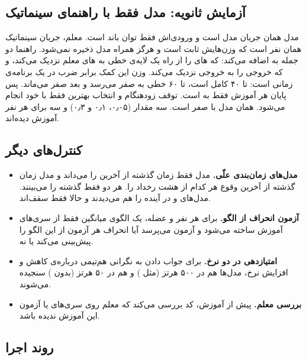 \subsection{آزمایش ثانویه: مدل فقط‌ با راهنمای سینماتیک}

مدل  همان جریان  مدل  است و ورودی‌اش فقط توان باند  است. معلم، جریان سینماتیک  همان نفر است که وزن‌هایش ثابت است و هرگز همراه مدل ذخیره نمی‌شود. راهنما دو جمله به  اضافه می‌کند:  که های  را از راه یک لایه‌ی خطی به های معلم نزدیک می‌کند، و  که خروجی را به خروجی  نزدیک می‌کند. وزن این کمک برابر  ضرب در یک برنامه‌ی زمانی است: تا  ۴۰ کامل است، تا  ۶۰ خطی به صفر می‌رسد و بعد صفر می‌ماند. پس پایان هر آموزش فقط  به  است. توقف زودهنگام و انتخاب بهترین  فقط با   خود  انجام می‌شود.  همان مدل با  صفر است. سه مقدار  (۰٫۰۵، ۰٫۱ و ۰٫۳) و سه  برای هر نفر آموزش دیده‌اند.

\subsection{کنترل‌های دیگر}

\begin{itemize}
\item \textbf{مدل‌های زمان‌بندی علّی.} مدل  فقط زمان گذشته از آخرین  را می‌داند و مدل  زمان گذشته از آخرین وقوع هر کدام از هشت رخداد را. هر دو فقط گذشته را می‌بینند. مدل‌های  و  در  آینده را هم می‌دیدند و حالا فقط سقف‌اند.
\item \textbf{آزمون انحراف از الگو.} برای هر نفر و عضله، یک الگوی میانگین  فقط از سری‌های آموزش ساخته می‌شود و آزمون می‌پرسد آیا  انحراف هر  آزمون از این الگو را پیش‌بینی می‌کند یا نه.
\item \textbf{امتیازدهی در دو نرخ.} برای جواب دادن به نگرانی هم‌تیمی درباره‌ی کاهش و افزایش نرخ، مدل‌ها هم در ۵۰۰ هرتز (مثل ) و هم در ۵۰ هرتز (بدون ) سنجیده می‌شوند.
\item \textbf{بررسی  معلم.} پیش از آموزش، کد بررسی می‌کند که معلم روی سری‌های  یا آزمون این  آموزش ندیده باشد.
\end{itemize}

\subsection{روند اجرا}


